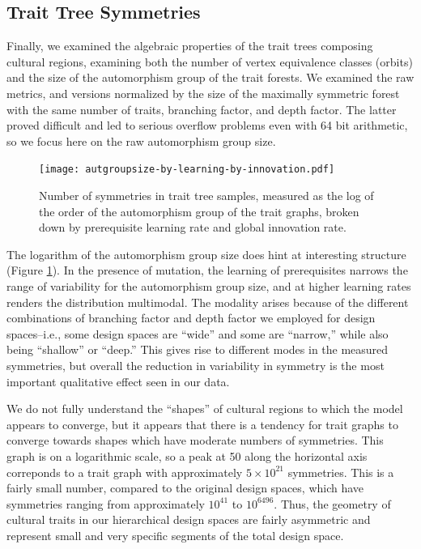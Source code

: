 \documentclass[graybox,natbib]{svmult}
\begin{document}
\subsection{Trait Tree Symmetries}\label{trait-tree-symmetries}

Finally, we examined the algebraic properties of the trait trees
composing cultural regions, examining both the number of vertex
equivalence classes (orbits) and the size of the automorphism group of
the trait forests. We examined the raw metrics, and versions normalized
by the size of the maximally symmetric forest with the same number of
traits, branching factor, and depth factor. The latter proved difficult
and led to serious overflow problems even with 64 bit arithmetic, so we
focus here on the raw automorphism group size.

\begin{figure}[h] 
\centering 
\texttt{[image: autgroupsize-by-learning-by-innovation.pdf]} 
\caption{Number of symmetries in trait tree samples, measured as the log of the order of the automorphism group of the trait graphs, broken down by prerequisite learning rate and global innovation rate.} 
\label{img:autgsize} 
\end{figure}

The logarithm of the automorphism group size does hint at interesting
structure (Figure \ref{img:autgsize}). In the presence of mutation, the
learning of prerequisites narrows the range of variability for the
automorphism group size, and at higher learning rates renders the
distribution multimodal. The modality arises because of the different
combinations of branching factor and depth factor we employed for design
spaces--i.e., some design spaces are ``wide'' and some are ``narrow,''
while also being ``shallow'' or ``deep.'' This gives rise to different
modes in the measured symmetries, but overall the reduction in
variability in symmetry is the most important qualitative effect seen in
our data.

We do not fully understand the ``shapes'' of cultural regions to which
the model appears to converge, but it appears that there is a tendency
for trait graphs to converge towards shapes which have moderate numbers
of symmetries. This graph is on a logarithmic scale, so a peak at 50
along the horizontal axis correponds to a trait graph with approximately
$5 \times 10^{21}$ symmetries. This is a fairly small number, compared
to the original design spaces, which have symmetries ranging from
approximately $10^{41}$ to $10^{6496}$. Thus, the geometry of cultural
traits in our hierarchical design spaces are fairly asymmetric and
represent small and very specific segments of the total design space.
\end{document}
